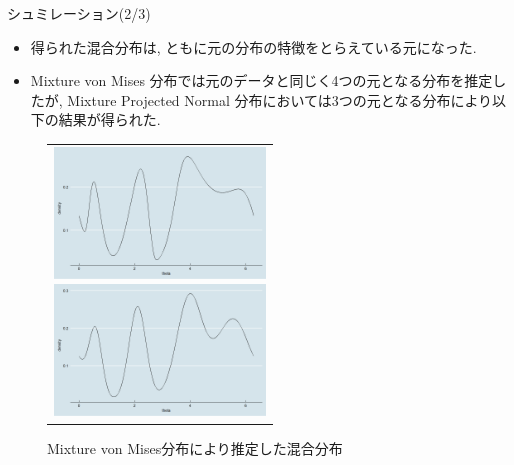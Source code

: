 \documentclass[dvipdfmx]{beamer}
\begin{document}
\begin{frame}{シュミレーション(2/3)}

\begin{itemize}
\item
得られた混合分布は, ともに元の分布の特徴をとらえている元になった.

\item
Mixture von Mises 分布では元のデータと同じく4つの元となる分布を推定したが, Mixture Projected Normal 分布においては3つの元となる分布により以下の結果が得られた.

\end{itemize}

\vspace{-0.3cm}
\begin{figure}[h]
 \begin{tabular}{c}
 \begin{minipage}{0.5\hsize}
  \begin{center}
   \includegraphics[clip,height= 35mm]{data/mix_pn.png}
  \end{center}
  \caption{Mixture Projected Normal 分布により推定した混合分布}
  \label{pnmix}
 \end{minipage}
 \begin{minipage}{0.5\hsize}
  \begin{center}
   \includegraphics[clip,height= 35mm]{data/mix_von.png}
  \end{center}
  \caption{Mixture von Mises分布により推定した混合分布}
  \label{vonmix}
 \end{minipage}
  \end{tabular}
\end{figure}

\end{frame}
\end{document}
